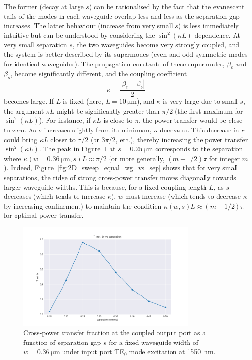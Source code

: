 \documentclass[10pt, a4paper]{article}
\begin{document}
The former (decay at large \(s\)) can be rationalised by the fact that the evanescent tails of the modes in each waveguide overlap less and less as the separation gap increases.
The latter behaviour (increase from very small \(s\)) is less immediately intuitive but can be understood by considering the \(\sin^2(\kappa L)\) dependence.
At very small separation \(s\), the two waveguides become very strongly coupled, and the system is better described by its supermodes (even and odd symmetric modes for identical waveguides). The propagation constants of these supermodes, \(\beta_e\) and \(\beta_o\), become significantly different, and the coupling coefficient
\[
  \kappa = \frac{|\beta_e - \beta_o|}{2}
\]
becomes large.
If \(L\) is fixed (here, \(L=\SI{10}{\um}\)), and \(\kappa\) is very large due to small \(s\), the argument \(\kappa L\) might be significantly greater than \(\pi/2\) (the first maximum for \(\sin^2(\kappa L)\)). For instance, if \(\kappa L\) is close to \(\pi\), the power transfer would be close to zero. As \(s\) increases slightly from its minimum, \(\kappa\) decreases. This decrease in \(\kappa\) could bring \(\kappa L\) closer to \(\pi/2\) (or \(3\pi/2\), etc.), thereby increasing the power transfer \(\sin^2(\kappa L)\).
The peak in Figure~\ref{fig:coupled_power_ridge} at \(s=\SI{0.25}{\um}\) corresponds to the separation where \(\kappa(w=\SI{0.36}{\um}, s)L \approx \pi/2\) (or more generally, \((m+1/2)\pi\) for integer \(m\)).
Indeed, Figure~\ref{fig:2D_sweep_equal_wg_vs_sep} shows that for very small separations,
the ridge of strong cross-power transfer moves diagonally towards larger waveguide widths.
This is because, for a fixed coupling length \(L\), as \(s\) decreases (which tends to increase \(\kappa\)), \(w\) must increase (which tends to decrease \(\kappa\) by increasing confinement) to maintain the condition \(\kappa(w,s) L \approx (m+1/2)\pi\) for optimal power transfer.

\begin{figure}[h!]
  \centering
  \includegraphics[width=0.8\textwidth]{task3/sweep_plots/sweep_idx_10_sweep__coupling_length=10_wg1_width=0.3571428571428572_wg2_width=0.3571428571428572_separation=0.15_0.5_8_center_wavelength=1.55_T_net_br_line.png}
  \caption{Cross-power transfer fraction at the coupled output port as a function of separation gap \(s\) for a fixed waveguide width of \(w=\SI{0.36}{\um}\) under input port TE\textsubscript{0} mode excitation at \SI{1550}{\nm}.}
  \label{fig:coupled_power_ridge}
\end{figure}
\end{document}
